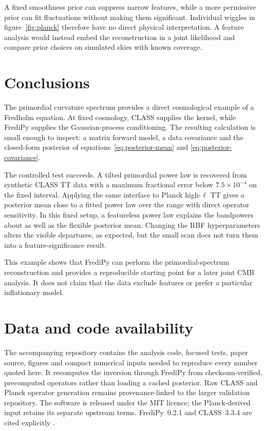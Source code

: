 \documentclass[11pt,a4paper]{article}
\begin{document}
A fixed smoothness prior can suppress narrow features, while a more permissive
prior can fit fluctuations without making them significant.  Individual
wiggles in figure~\ref{fig:planck} therefore have no direct physical
interpretation.  A feature analysis would instead embed the reconstruction in
a joint likelihood and compare prior choices on simulated skies with known
coverage.

\section{Conclusions}
\label{sec:conclusions}

The primordial curvature spectrum provides a direct cosmological example of a
Fredholm equation.  At fixed cosmology, CLASS supplies the kernel, while
FrediPy supplies the Gaussian-process conditioning.  The resulting calculation
is small enough to inspect: a matrix forward model, a data covariance and the
closed-form posterior of equations~\eqref{eq:posterior-mean} and
\eqref{eq:posterior-covariance}.

The controlled test succeeds.  A tilted primordial power law is recovered from
synthetic CLASS TT data with a maximum fractional error below
$7.5\times10^{-4}$ on the fixed interval.  Applying the same interface to
Planck high-$\ell$ TT gives a posterior mean close to a fitted power law over
the range with direct operator sensitivity.  In this fixed setup, a featureless
power law explains the bandpowers about as well as the flexible posterior mean.
Changing the RBF hyperparameters alters the visible departures, as expected,
but the small scan does not turn them into a feature-significance result.

This example shows that FrediPy can perform the primordial-spectrum
reconstruction and provides a reproducible starting point for a later joint
CMB analysis.  It does not claim that the data exclude features or prefer a
particular inflationary model.

\section*{Data and code availability}

The accompanying repository contains the analysis code, focused tests, paper
source, figures and compact numerical inputs needed to reproduce every number
quoted here.  It recomputes the inversion through FrediPy from checksum-verified,
precomputed operators rather than loading a cached posterior.  Raw CLASS and
Planck operator generation remains provenance-linked to the larger validation
repository.  The software is released under the MIT licence; the Planck-derived
input retains its separate upstream terms.  FrediPy~0.2.1 and CLASS~3.3.4 are
cited explicitly \citep{fredipy,blas2011}.
\end{document}
